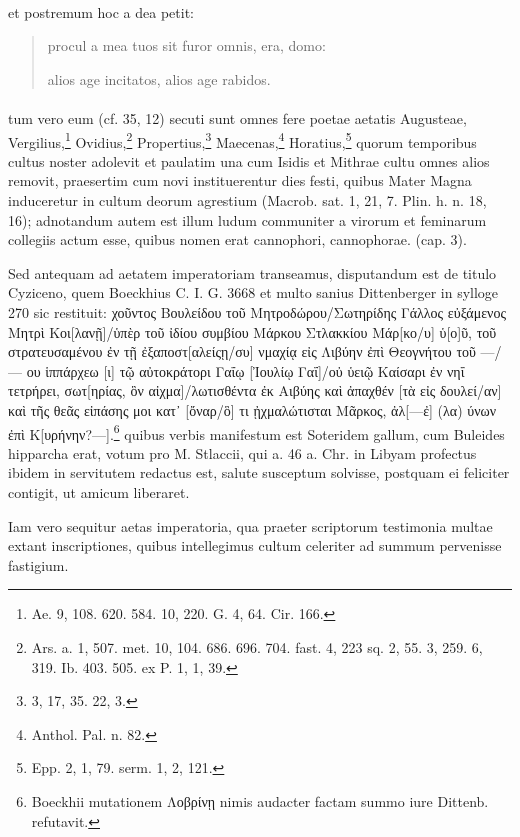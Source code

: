 \documentclass[a4paper, 11pt, oneside, polutonikogreek, german, twocolumn]{article}
\begin{document}
\paragraph{}
et postremum hoc a dea petit:
\begin{quotation}
procul a mea tuos sit furor omnis, era, domo:

alios age incitatos, alios age rabidos.
\end{quotation}
\paragraph{}
tum vero eum (cf. 35, 12) secuti sunt omnes fere poetae aetatis Augusteae, Vergilius,\footnote{Ae. 9, 108. 620. 584. 10, 220. G. 4, 64. Cir. 166.} Ovidius,\footnote{Ars. a. 1, 507. met. 10, 104. 686. 696. 704. fast. 4, 223 sq. 2, 55. 3, 259. 6, 319. Ib. 403. 505. ex P. 1, 1, 39.} Propertius,\footnote{3, 17, 35. 22, 3.} Maecenas,\footnote{Anthol. Pal. n. 82.} Horatius,\footnote{Epp. 2, 1, 79. serm. 1, 2, 121.} quorum temporibus cultus noster adolevit et paulatim una cum Isidis et Mithrae cultu omnes alios removit, praesertim cum novi instituerentur dies festi, quibus Mater Magna induceretur in cultum deorum agrestium (Macrob. sat. 1, 21, 7. Plin. h. n. 18, 16); adnotandum autem est illum ludum communiter a virorum et feminarum collegiis actum esse, quibus nomen erat cannophori, cannophorae. (cap. 3).

Sed antequam ad aetatem imperatoriam transeamus, disputandum est de titulo Cyziceno, quem Boeckhius C. I. G. 3668 et multo sanius Dittenberger in sylloge 270 sic restituit: χοῦντος Βουλείδου τοῦ Μητροδώρου/Σωτηρίδης Γάλλος εὐξάμενος Μητρὶ Κοι[λανῇ]/ὑπὲρ τοῦ ἰδίου συμβίου Μάρκου Στλακκίου Μάρ[κο/υ] ὑ[ο]ῦ, τοῦ στρατευσαμένου ἐν τῇ ἐξαποστ[αλείςῃ/συ] νμαχίᾳ εἰς Λιβύην ἐπὶ Θεογνήτου τοῦ ---/--- ου ἱππάρχεω [ι] τῷ αὐτοκράτορι Γαΐῳ [Ἰουλίῳ Γαΐ]/οὐ ὑειῷ Καίσαρι ἐν νηΐ τετρήρει, σωτ[ηρίας, ὃν αἰχμα]/λωτισθέντα ἐκ Αιβύης καὶ ἀπαχθέν [τὰ εἰς δουλεί/αν] καὶ τῆς θεᾶς εἰπάσης μοι κατ᾽ [ὄναρ/ὃ] τι ᾐχμαλώτισται Μᾶρκος, ἀλ[---ἐ] (λα) ύνων ἐπὶ Κ[υρήνην?---].\footnote{Boeckhii mutationem Λοβρίνῃ nimis audacter factam summo iure Dittenb. refutavit.} quibus verbis manifestum est Soteridem gallum, cum Buleides hipparcha erat, votum pro M. Stlaccii, qui a. 46 a. Chr. in Libyam profectus ibidem in servitutem redactus est, salute susceptum solvisse, postquam ei feliciter contigit, ut amicum liberaret.

Iam vero sequitur aetas imperatoria, qua praeter scriptorum testimonia multae extant inscriptiones, quibus intellegimus cultum celeriter ad summum pervenisse fastigium.
\end{document}
